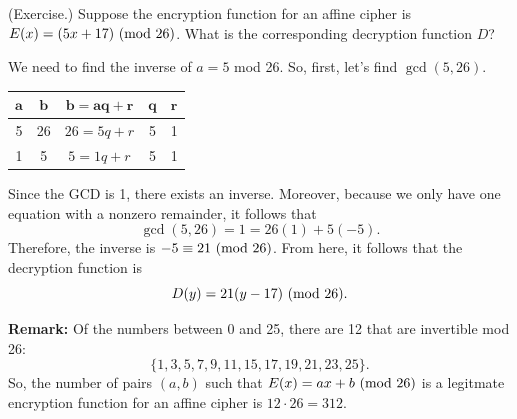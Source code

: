 \documentclass[letterpaper]{article}
\newcommand{\0}{\mathbf{0}}
\begin{document}
\begin{mdframed}
    (Exercise.) Suppose the encryption function for an affine cipher is $E(x) = (5x + 17) \ (\mathrm{mod}\ 26)$. What is the corresponding decryption function $D$? 

    \begin{mdframed}
        We need to find the inverse of $a = 5$ mod 26. So, first, let's find $\gcd(5, 26)$.
        \begin{center}
            \begin{tabular}{|c|c|c|c|c|}
                \hline 
                $\mathbf{a}$ & $\mathbf{b}$ & $\mathbf{b = aq + r}$ & $\mathbf{q}$ & $\mathbf{r}$ \\ 
                \hline 
                5 & 26 & $26 = 5q + r$ & 5 & 1 \\ 
                1 & 5 & $5 = 1q + r$ & 5 & 1 \\ 
                \hline 
            \end{tabular}
        \end{center}
        Since the GCD is 1, there exists an inverse. Moreover, because we only have one equation with a nonzero remainder, it follows that 
        \[\gcd(5, 26) = 1 = 26(1) + 5(-5).\]
        Therefore, the inverse is $-5 \equiv 21 \ (\mathrm{mod}\ 26)$. From here, it follows that the decryption function is \[D(y) = 21(y - 17) \ (\mathrm{mod}\ 26).\]
    \end{mdframed}
\end{mdframed}
\textbf{Remark:} Of the numbers between 0 and 25, there are 12 that are invertible mod 26: 
\[\{1, 3, 5, 7, 9, 11, 15, 17, 19, 21, 23, 25\}.\]
So, the number of pairs $(a, b)$ such that $E(x) = ax + b \ (\mathrm{mod}\ 26)$ is a legitmate encryption function for an affine cipher is $12 \cdot 26 = 312$. 
\end{document}
